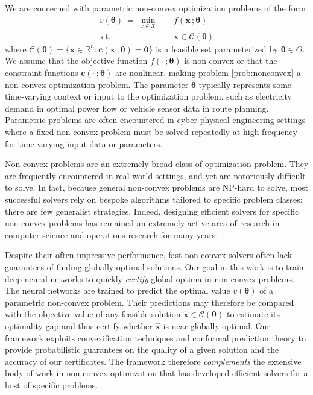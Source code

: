 \documentclass[10pt]{article} %
\theoremstyle{plain}
\theoremstyle{definition}
\theoremstyle{remark}
\begin{document}
We are concerned with parametric non-convex optimization problems of the form
\begin{equation}
\label{prob:nonconvex}
\begin{aligned}
    v(\bm{\theta}) ~=~ \min_{x \in \mathcal{X}} \quad & f(\mathbf{x}\,;\bm{\theta}) \\
    \text{s.t.} \quad & \mathbf{x} \in \mathcal{C}(\bm{\theta})
\end{aligned}
\end{equation}
where $\mathcal{C}(\bm{\theta}) = \{\mathbf{x} \in \mathbb{R}^n: \mathbf{c}(\mathbf{x} \,; \bm{\theta}) = \mathbf{0}\}$ is a feasible set parameterized by $\bm{\theta} \in \Theta$. We assume that the objective function $f(\cdot\,; \bm{\theta})$ is non-convex or that the constraint functions $\mathbf{c}(\cdot\,;\bm{\theta})$ are nonlinear, making problem \cref{prob:nonconvex}{}{} a non-convex optimization problem. The parameter $\bm{\theta}$ typically represents some time-varying context or input to the optimization problem, such as electricity demand in optimal power flow or vehicle sensor data in route planning. Parametric problems are often encountered in cyber-physical engineering settings where a fixed non-convex problem must be solved repeatedly at high frequency for time-varying input data or parameters.

Non-convex problems are an extremely broad class of optimization problem. They are frequently encountered in real-world settings, and yet are notoriously difficult to solve. In fact, because general non-convex problems are NP-hard to solve, most successful solvers rely on bespoke algorithms tailored to specific problem classes; there are few generalist strategies. Indeed, designing efficient solvers for specific non-convex problems has remained an extremely active area of research in computer science and operations research for many years.

Despite their often impressive performance, fast non-convex solvers often lack guarantees of finding globally optimal solutions.
Our goal in this work is to train deep neural networks to quickly \textit{certify} global optima in non-convex problems.
The neural networks are trained to predict the optimal value $v(\bm{\theta})$ of a parametric non-convex problem. Their predictions may therefore be compared with the objective value of any feasible solution $\hat{\bm{x}} \in \mathcal{C}(\bm{\theta})$ to estimate its optimality gap and thus certify whether $\hat{\bm{x}}$ is near-globally optimal.
Our framework exploits convexification techniques and conformal prediction theory to provide probabilistic guarantees on the quality of a given solution and the accuracy of our certificates. 
The framework therefore \textit{complements} the extensive body of work in non-convex optimization that has developed efficient solvers for a host of specific problems.
\end{document}
